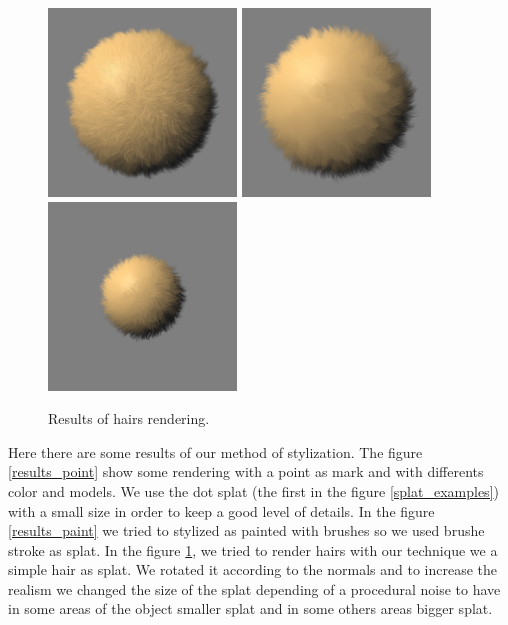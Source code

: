 \begin{figure}
    \begin{center}
    \includegraphics[width=50mm, height=50mm]{Resultats/bouledepoil1/final.png}
    \includegraphics[width=50mm, height=50mm]{Resultats/bouledepoil2/final.png}
    \includegraphics[width=50mm, height=50mm]{Resultats/bouledepoilFractalized/final.png}
    \end{center}
    \caption{Results of hairs rendering.}
    \label{results_hairs}
\end{figure}


Here there are some results of our method of stylization. The figure \ref{results_point} show some rendering with a point as mark and with differents color and models. We use the dot splat (the first in the figure \ref{splat_examples}) with a small size in order to keep a good level of details. In the figure \ref{results_paint} we tried to stylized as painted with brushes so we used brushe stroke as splat. In the figure \ref{results_hairs}, we tried to render hairs with our technique we a simple hair as splat. We rotated it according to the normals and to increase the realism we changed the size of the splat depending of a procedural noise to have in some areas of the object smaller splat and in some others areas bigger splat.









